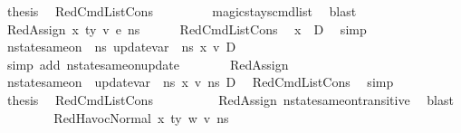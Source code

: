 \begin{isabellebody}
\ {\isacharquery}{\kern0pt}thesis\ \isamarkupfalse%
\ RedCmdListCons\ \isanewline
\ \ \ \ \ \ \isamarkupfalse%
\ magic{\isacharunderscore}{\kern0pt}stays{\isacharunderscore}{\kern0pt}cmd{\isacharunderscore}{\kern0pt}list\ \isamarkupfalse%
\ blast\isanewline
\ \ \isamarkupfalse%
\isanewline
\ \ \ \ \isamarkupfalse%
\ {\isacharparenleft}{\kern0pt}RedAssign\ x\ ty\ v\ e\ n{\isacharunderscore}{\kern0pt}s{\isacharparenright}{\kern0pt}\isanewline
\ \ \ \ \isamarkupfalse%
\ RedCmdListCons\ \isamarkupfalse%
\ {\isachardoublequoteopen}x\ {\isasymin}\ D{\isachardoublequoteclose}\ \isamarkupfalse%
\ simp\isanewline
\ \ \ \ \isamarkupfalse%
\ {\isachardoublequoteopen}nstate{\isacharunderscore}{\kern0pt}same{\isacharunderscore}{\kern0pt}on\ {\isasymLambda}\ n{\isacharunderscore}{\kern0pt}s\ {\isacharparenleft}{\kern0pt}update{\isacharunderscore}{\kern0pt}var\ {\isasymLambda}\ n{\isacharunderscore}{\kern0pt}s\ x\ v{\isacharparenright}{\kern0pt}\ D{\isachardoublequoteclose}\ \isanewline
\ \ \ \ \ \ \isamarkupfalse%
\ {\isacharparenleft}{\kern0pt}simp\ add{\isacharcolon}{\kern0pt}\ nstate{\isacharunderscore}{\kern0pt}same{\isacharunderscore}{\kern0pt}on{\isacharunderscore}{\kern0pt}update{\isacharunderscore}{\kern0pt}{}{\isacharparenright}{\kern0pt}\isanewline
\ \ \ \ \isamarkupfalse%
\ \isamarkupfalse%
\ RedAssign\ \isamarkupfalse%
\ {\isachardoublequoteopen}nstate{\isacharunderscore}{\kern0pt}same{\isacharunderscore}{\kern0pt}on\ {\isasymLambda}\ {\isacharparenleft}{\kern0pt}update{\isacharunderscore}{\kern0pt}var\ {\isasymLambda}\ n{\isacharunderscore}{\kern0pt}s\ x\ v{\isacharparenright}{\kern0pt}\ ns{\isacharprime}{\kern0pt}\ D{\isachardoublequoteclose}\ \isamarkupfalse%
\ RedCmdListCons\ \isamarkupfalse%
\ simp\isanewline
\ \ \ \ \isamarkupfalse%
\ \isamarkupfalse%
\ {\isacharquery}{\kern0pt}thesis\ \isamarkupfalse%
\ RedCmdListCons\ \ \isanewline
\ \ \ \ \ \ \isamarkupfalse%
\ RedAssign\ nstate{\isacharunderscore}{\kern0pt}same{\isacharunderscore}{\kern0pt}on{\isacharunderscore}{\kern0pt}transitive\ \isamarkupfalse%
\ blast\isanewline
\ \ \isamarkupfalse%
\isanewline
\ \ \ \ \isamarkupfalse%
\ {\isacharparenleft}{\kern0pt}RedHavocNormal\ x\ ty\ w\ v\ n{\isacharunderscore}{\kern0pt}s{\isacharparenright}{\kern0pt}\isanewline

\end{isabellebody}
